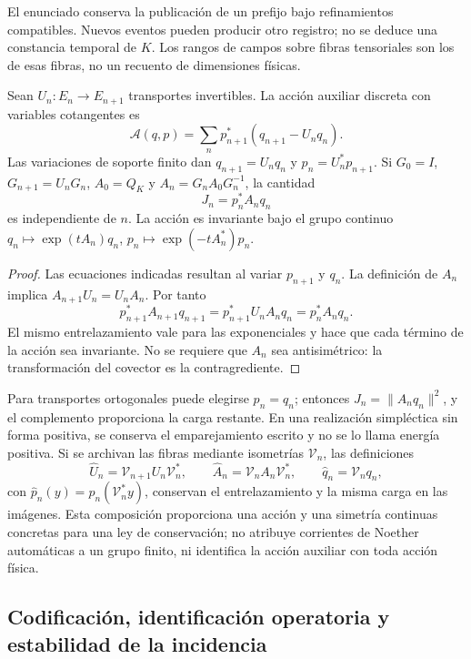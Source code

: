 El enunciado conserva la publicación de un prefijo bajo refinamientos
compatibles. Nuevos eventos pueden producir otro registro; no se deduce
una constancia temporal de \(K\). Los rangos de campos sobre fibras
tensoriales son los de esas fibras, no un recuento de dimensiones físicas.

\begin{proposition}
\label{lib01:carga-noether}
Sean \(U_n:E_n\to E_{n+1}\) transportes invertibles. La acción
auxiliar discreta con variables cotangentes es
\[
 \mathcal A(q,p)=\sum_n p_{n+1}^*(q_{n+1}-U_nq_n).
\]
Las variaciones de soporte finito dan
\(q_{n+1}=U_nq_n\) y \(p_n=U_n^*p_{n+1}\). Si
\(G_0=I\), \(G_{n+1}=U_nG_n\), \(A_0=Q_K\) y
\(A_n=G_nA_0G_n^{-1}\), la cantidad
\[
 J_n=p_n^*A_nq_n
\]
es independiente de \(n\). La acción es invariante bajo el grupo
continuo
\(q_n\mapsto\exp(tA_n)q_n\),
\(p_n\mapsto\exp(-tA_n^*)p_n\).
\end{proposition}
\begin{proof}
Las ecuaciones indicadas resultan al variar \(p_{n+1}\) y \(q_n\).
La definición de \(A_n\) implica
\(A_{n+1}U_n=U_nA_n\). Por tanto
\[
 p_{n+1}^*A_{n+1}q_{n+1}
 =p_{n+1}^*U_nA_nq_n=p_n^*A_nq_n.
\]
El mismo entrelazamiento vale para las exponenciales y hace que cada
término de la acción sea invariante. No se requiere que \(A_n\)
sea antisimétrico: la transformación del covector es la contragrediente.
\end{proof}

Para transportes ortogonales puede elegirse \(p_n=q_n\); entonces
\(J_n=\|A_nq_n\|^2\), y el complemento proporciona la carga
restante. En una realización simpléctica sin forma positiva, se conserva
el emparejamiento escrito y no se lo llama energía positiva. Si se
archivan las fibras mediante isometrías \(\mathcal V_n\), las
definiciones
\[
 \widehat U_n=\mathcal V_{n+1}U_n\mathcal V_n^*,\qquad
 \widehat A_n=\mathcal V_nA_n\mathcal V_n^*,\qquad
 \widehat q_n=\mathcal V_nq_n,
\]
con \(\widehat p_n(y)=p_n(\mathcal V_n^*y)\), conservan el
entrelazamiento y la misma carga en las imágenes. Esta composición
proporciona una acción y una simetría continuas concretas para una ley de
conservación; no atribuye corrientes de Noether automáticas a un grupo
finito, ni identifica la acción auxiliar con toda acción física.

\subsection{Codificación, identificación operatoria y estabilidad de la incidencia}
\label{lib01:alcance}

